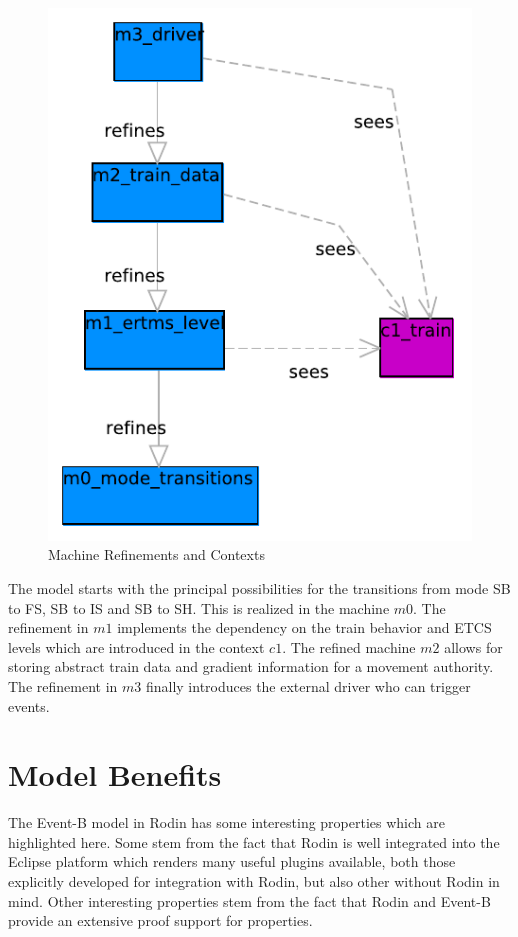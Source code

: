 \documentclass{template/openetcs_article}
\begin{document}
\begin{figure}[ht]
  \centering
  \includegraphics[width=.35\textwidth]{Subset_026_Chap_4_6}
  \caption{Machine Refinements and Contexts}
  \label{fig:model-overview}
\end{figure}

The model starts with the principal possibilities for the transitions from mode
SB to FS, SB to IS and SB to SH. This is realized in the machine $m0$. The
refinement in $m1$ implements the dependency on the train behavior and ETCS
levels which are introduced in the context $c1$. The refined machine $m2$ allows
for storing abstract train data and gradient information for a movement
authority. The refinement in $m3$ finally introduces the external driver who can
trigger events.

\section{Model Benefits}
\label{sec:model-highlights}

The Event-B model in Rodin has some interesting properties which are highlighted
here. Some stem from the fact that Rodin is well integrated into the Eclipse
platform which renders many useful plugins available, both those explicitly
developed for integration with Rodin, but also other without Rodin in mind.
Other interesting properties stem from the fact that Rodin and Event-B provide
an extensive proof support for properties.
\end{document}
